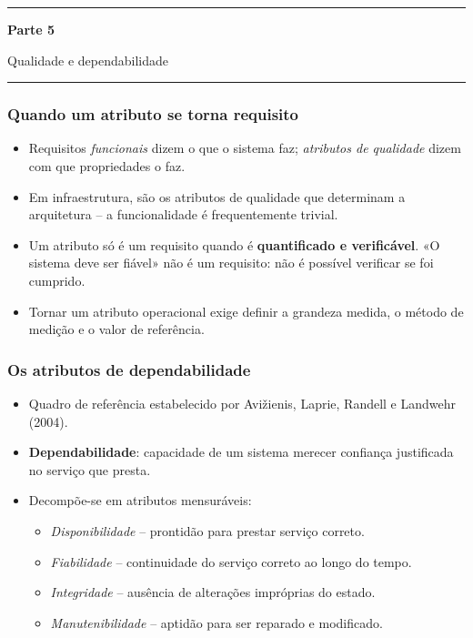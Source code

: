 \documentclass[aspectratio=169]{beamer}
\newcommand{\seccao}[2]{%
  \begin{frame}[plain]
    \vspace*{2.2cm}
    \begin{center}
      {\color{NudeTaupe}\rule{3cm}{0.5pt}}\par
      \vspace{0.6cm}
      {\Huge\bfseries\textcolor{TextEspresso}{#1}}\par
      \vspace{0.5cm}
      {\large\textcolor{NudeTaupe}{#2}}\par
      \vspace{0.6cm}
      {\color{NudeTaupe}\rule{3cm}{0.5pt}}
    \end{center}
  \end{frame}
}
\begin{document}
\seccao{Parte 5}{Qualidade e dependabilidade}

\begin{frame}
\frametitle{Quando um atributo se torna requisito}
\begin{itemize}
    \setlength\itemsep{0.35cm}
    \item Requisitos \emph{funcionais} dizem o que o sistema faz; \emph{atributos de qualidade} dizem com que propriedades o faz.
    \item Em infraestrutura, são os atributos de qualidade que determinam a arquitetura -- a funcionalidade é frequentemente trivial.
    \item Um atributo só é um requisito quando é \textbf{quantificado e verificável}. «O sistema deve ser fiável» não é um requisito: não é possível verificar se foi cumprido.
    \item Tornar um atributo operacional exige definir a grandeza medida, o método de medição e o valor de referência.
\end{itemize}
\end{frame}

\begin{frame}
\frametitle{Os atributos de dependabilidade}
\begin{itemize}
    \setlength\itemsep{0.3cm}
    \item Quadro de referência estabelecido por Avižienis, Laprie, Randell e Landwehr (2004).
    \item \textbf{Dependabilidade}: capacidade de um sistema merecer confiança justificada no serviço que presta.
    \item Decompõe-se em atributos mensuráveis:
    \begin{itemize}
      \item \emph{Disponibilidade} -- prontidão para prestar serviço correto.
      \item \emph{Fiabilidade} -- continuidade do serviço correto ao longo do tempo.
      \item \emph{Integridade} -- ausência de alterações impróprias do estado.
      \item \emph{Manutenibilidade} -- aptidão para ser reparado e modificado.
    \end{itemize}
\end{itemize}
\end{frame}
\end{document}
